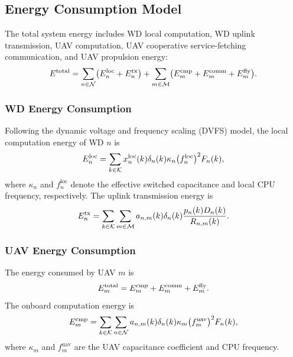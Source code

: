 \documentclass[journal]{IEEEtran}
\begin{document}
\subsection{Energy Consumption Model}
\label{sec:energy_model}

The total system energy includes WD local computation, WD uplink transmission, UAV computation, UAV cooperative service-fetching communication, and UAV propulsion energy:
\begin{equation}
\small
    E^{\mathrm{total}}
    = \sum_{n\in\mathcal{N}}
    \bigl(E_n^{\mathrm{loc}} + E_n^{\mathrm{tx}}\bigr)
    + \sum_{m\in\mathcal{M}}
    \bigl(E_m^{\mathrm{cmp}} + E_m^{\mathrm{comm}} + E_m^{\mathrm{fly}}\bigr).
    \label{eq:total_energy}
\end{equation}

\subsubsection{WD Energy Consumption}

Following the dynamic voltage and frequency scaling (DVFS) model, the local computation energy of WD $n$ is
\begin{equation}
\small
    E_n^{\mathrm{loc}}
    =
    \sum_{k\in\mathcal{K}}
    x_n^{\mathrm{loc}}(k)\delta_n(k)
    \kappa_n \bigl(f_n^{\mathrm{loc}}\bigr)^2 F_n(k),
    \label{eq:wd_loc_energy_total}
\end{equation}
where $\kappa_n$ and $f_n^{\mathrm{loc}}$ denote the effective switched capacitance and local CPU frequency, respectively. The uplink transmission energy is
\begin{equation}
\small
    E_n^{\mathrm{tx}}
    =
    \sum_{k\in\mathcal{K}}\sum_{m\in\mathcal{M}}
    a_{n,m}(k)\delta_n(k)
    \frac{p_n(k)D_n(k)}{R_{n,m}(k)}.
    \label{eq:wd_tx_energy_total}
\end{equation}

\subsubsection{UAV Energy Consumption}

The energy consumed by UAV $m$ is
\begin{equation}
\small
    E_m^{\mathrm{total}}
    = E_m^{\mathrm{cmp}} + E_m^{\mathrm{comm}} + E_m^{\mathrm{fly}}.
    \label{eq:uav_total_energy}
\end{equation}
The onboard computation energy is
\begin{equation}
\small
    E_m^{\mathrm{cmp}}
    =
    \sum_{k\in\mathcal{K}}\sum_{n\in\mathcal{N}}
    a_{n,m}(k)\delta_n(k)
    \kappa_m \bigl(f_m^{\mathrm{uav}}\bigr)^2 F_n(k),
    \label{eq:uav_cmp_energy_total}
\end{equation}
where $\kappa_m$ and $f_m^{\mathrm{uav}}$ are the UAV capacitance coefficient and CPU frequency.
\end{document}
